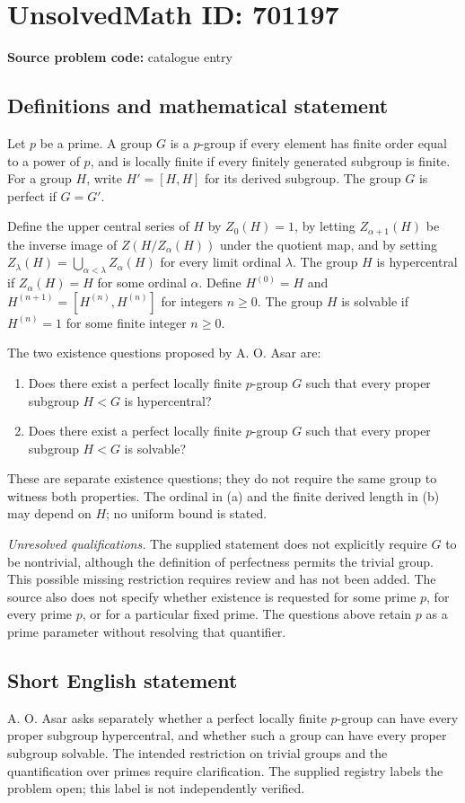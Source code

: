 \documentclass[11pt]{article}
\begin{document}
\section*{UnsolvedMath ID: 701197}
\textbf{Source problem code:} catalogue entry
\subsection{Definitions and mathematical statement}
Let \(p\) be a prime. A group \(G\) is a \(p\)-group if every element has finite order equal to a power of \(p\), and is locally finite if every finitely generated subgroup is finite. For a group \(H\), write \(H'=[H,H]\) for its derived subgroup. The group \(G\) is perfect if \(G=G'\).

Define the upper central series of \(H\) by \(Z_0(H)=1\), by letting \(Z_{\alpha+1}(H)\) be the inverse image of \(Z(H/Z_\alpha(H))\) under the quotient map, and by setting \(Z_\lambda(H)=\bigcup_{\alpha<\lambda}Z_\alpha(H)\) for every limit ordinal \(\lambda\). The group \(H\) is hypercentral if \(Z_\alpha(H)=H\) for some ordinal \(\alpha\). Define \(H^{(0)}=H\) and \(H^{(n+1)}=[H^{(n)},H^{(n)}]\) for integers \(n\geq 0\). The group \(H\) is solvable if \(H^{(n)}=1\) for some finite integer \(n\geq 0\).

The two existence questions proposed by A. O. Asar are:
\begin{enumerate}
\item[(a)] Does there exist a perfect locally finite \(p\)-group \(G\) such that every proper subgroup \(H<G\) is hypercentral?
\item[(b)] Does there exist a perfect locally finite \(p\)-group \(G\) such that every proper subgroup \(H<G\) is solvable?
\end{enumerate}
These are separate existence questions; they do not require the same group to witness both properties. The ordinal in (a) and the finite derived length in (b) may depend on \(H\); no uniform bound is stated.

\emph{Unresolved qualifications.} The supplied statement does not explicitly require \(G\) to be nontrivial, although the definition of perfectness permits the trivial group. This possible missing restriction requires review and has not been added. The source also does not specify whether existence is requested for some prime \(p\), for every prime \(p\), or for a particular fixed prime. The questions above retain \(p\) as a prime parameter without resolving that quantifier.
\subsection{Short English statement}
A. O. Asar asks separately whether a perfect locally finite \(p\)-group can have every proper subgroup hypercentral, and whether such a group can have every proper subgroup solvable. The intended restriction on trivial groups and the quantification over primes require clarification. The supplied registry labels the problem open; this label is not independently verified.
\end{document}
